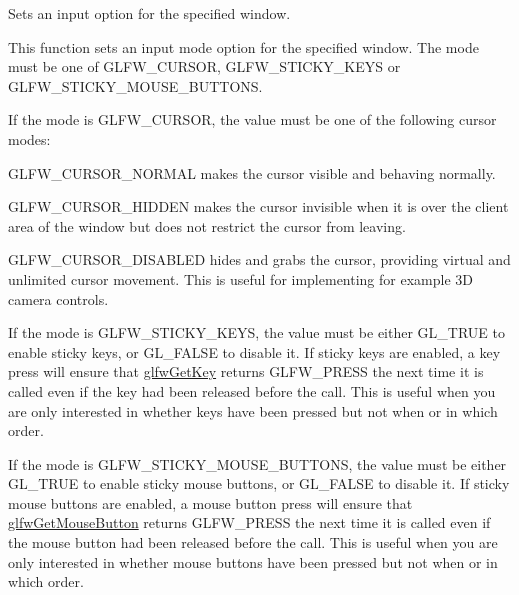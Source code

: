 Sets an input option for the specified window. 

This function sets an input mode option for the specified window. The mode must be one of {\ttfamily G\+L\+F\+W\+\_\+\+C\+U\+R\+S\+O\+R}, {\ttfamily G\+L\+F\+W\+\_\+\+S\+T\+I\+C\+K\+Y\+\_\+\+K\+E\+Y\+S} or {\ttfamily G\+L\+F\+W\+\_\+\+S\+T\+I\+C\+K\+Y\+\_\+\+M\+O\+U\+S\+E\+\_\+\+B\+U\+T\+T\+O\+N\+S}.

If the mode is {\ttfamily G\+L\+F\+W\+\_\+\+C\+U\+R\+S\+O\+R}, the value must be one of the following cursor modes\+:
\begin{DoxyItemize}
\item {\ttfamily G\+L\+F\+W\+\_\+\+C\+U\+R\+S\+O\+R\+\_\+\+N\+O\+R\+M\+A\+L} makes the cursor visible and behaving normally.
\item {\ttfamily G\+L\+F\+W\+\_\+\+C\+U\+R\+S\+O\+R\+\_\+\+H\+I\+D\+D\+E\+N} makes the cursor invisible when it is over the client area of the window but does not restrict the cursor from leaving.
\item {\ttfamily G\+L\+F\+W\+\_\+\+C\+U\+R\+S\+O\+R\+\_\+\+D\+I\+S\+A\+B\+L\+E\+D} hides and grabs the cursor, providing virtual and unlimited cursor movement. This is useful for implementing for example 3\+D camera controls.
\end{DoxyItemize}

If the mode is {\ttfamily G\+L\+F\+W\+\_\+\+S\+T\+I\+C\+K\+Y\+\_\+\+K\+E\+Y\+S}, the value must be either {\ttfamily G\+L\+\_\+\+T\+R\+U\+E} to enable sticky keys, or {\ttfamily G\+L\+\_\+\+F\+A\+L\+S\+E} to disable it. If sticky keys are enabled, a key press will ensure that \hyperlink{group__input_ga7d8ad8ffaf272808f04e1d5d33ec8859}{glfw\+Get\+Key} returns {\ttfamily G\+L\+F\+W\+\_\+\+P\+R\+E\+S\+S} the next time it is called even if the key had been released before the call. This is useful when you are only interested in whether keys have been pressed but not when or in which order.

If the mode is {\ttfamily G\+L\+F\+W\+\_\+\+S\+T\+I\+C\+K\+Y\+\_\+\+M\+O\+U\+S\+E\+\_\+\+B\+U\+T\+T\+O\+N\+S}, the value must be either {\ttfamily G\+L\+\_\+\+T\+R\+U\+E} to enable sticky mouse buttons, or {\ttfamily G\+L\+\_\+\+F\+A\+L\+S\+E} to disable it. If sticky mouse buttons are enabled, a mouse button press will ensure that \hyperlink{group__input_ga6da5efb04f700c312a57a169fa9393a0}{glfw\+Get\+Mouse\+Button} returns {\ttfamily G\+L\+F\+W\+\_\+\+P\+R\+E\+S\+S} the next time it is called even if the mouse button had been released before the call. This is useful when you are only interested in whether mouse buttons have been pressed but not when or in which order.


